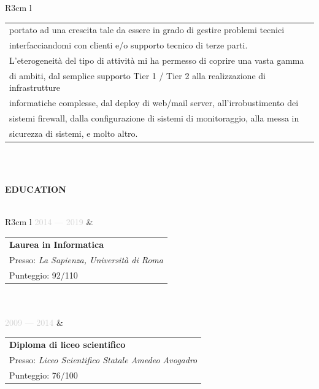 \documentclass{article}
\begin{document}
\begin{tabular}{ R{3cm} l }
\begin{tabular}[l]{@{}l@{}}
		portato ad una crescita tale da essere in grado di gestire problemi tecnici \\
		interfacciandomi con clienti e/o supporto tecnico di terze parti. \\
		L'eterogeneità del tipo di attivit\`a mi ha permesso di coprire una vasta gamma \\
		di ambiti, dal semplice supporto Tier 1 / Tier 2 alla realizzazione di infrastrutture \\
		informatiche complesse, dal deploy di web/mail server, all'irrobustimento dei \\
		sistemi firewall, dalla configurazione di sistemi di monitoraggio, alla messa in \\
		sicurezza di sistemi, e molto altro.
		\end{tabular} \\\\ \hfill
\end{tabular}

\textbf{\textcolor{deepblue}{\uppercase{{{education}}}}} \\\\ \hfill
\begin{tabular}{ R{3cm} l }
	\textcolor{lightgray}{2014 — 2019} & \begin{tabular}[l]{@{}l@{}}
	\textbf{Laurea in Informatica} \\
	Presso: \textit{La Sapienza, Universit\`a di Roma} \\
	Punteggio: 92/110
\end{tabular} \\\\ \hfill
\textcolor{lightgray}{2009 — 2014}  & \begin{tabular}[l]{@{}l@{}}
\textbf{Diploma di liceo scientifico} \\
Presso: \textit{Liceo Scientifico Statale Amedeo Avogadro} \\
Punteggio: 76/100
\end{tabular} \\\\ \hfill
\end{tabular}

\newpage
\end{document}
